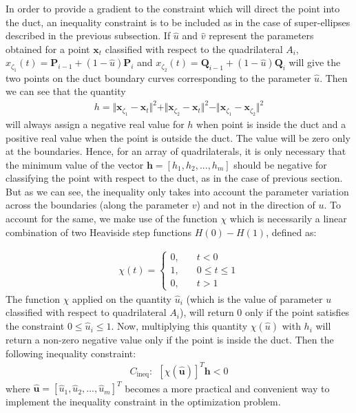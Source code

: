 \documentclass[12pt,a4]{article}
\begin{document}
In order to provide a gradient to the constraint which will direct the point into the duct, an inequality constraint is to be included as in the case of super-ellipses described in the previous subsection. If $\hat{u}$ and $\hat{v}$ represent the parameters obtained for a point $\mathbf{x}_t$ classified with respect to the quadrilateral $A_i$, $x_{\zeta_1}(t) = \mathbf{P}_{i-1}+\left(1-{\hat{u}} \right)\mathbf{P}_i$ and $x_{\zeta_2}(t) = \mathbf{Q}_{i-1}+\left(1-{\hat{u}} \right)\mathbf{Q}_i$ will give the two points on the duct boundary curves corresponding to the parameter $\hat{u}$. Then we can see that the quantity
\begin{align}
\label{eq:ductgradientinquad}
h = \Vert \mathbf{x}_{\zeta_1}-\mathbf{x}_t\Vert^2+\Vert \mathbf{x}_{\zeta_2}-\mathbf{x}_t\Vert^2-\Vert \mathbf{x}_{\zeta_1}- \mathbf{x}_{\zeta_2}\Vert^2
\end{align}
will always assign a negative real value for $h$ when point is inside the duct and a positive real value when the point is outside the duct. The value will be zero only at the boundaries. Hence, for an array of quadrilaterals, it is only necessary that the minimum value of the vector $\mathbf{h} = [{h}_1, {h}_2,...,{h}_m]$ should be negative for classifying the point with respect to the duct, as in the case of previous section. But as we can see, the inequality only takes into account the parameter variation across the boundaries (along the parameter $v$) and not in the direction of $u$. To account for the same, we make use of the function $\chi$ which is necessarily a linear combination of two Heaviside step functions $H(0)-H(1)$, defined as:

\begin{align}
\label{eq:chifunction}
\chi(t) = \left\lbrace \begin{matrix}
0,&\quad t<0 \\
1,&\quad 0\leq t \leq 1\\
0, &\quad t >1
\end{matrix}\right.
\end{align}
The function $\chi$ applied on the quantity $\hat{u}_i$ (which is the value of parameter ${u}$ classified with respect to quadrilateral $A_i$), will return 0 only if the point satisfies the constraint $0\leq \hat{u}_i\leq 1$. Now, multiplying this quantity $\chi(\hat{u})$ with $h_i$ will return a non-zero negative value only if the point is inside the duct. Then the following inequality constraint:
\begin{align}
\label{eq:quadrils}
C_{\text{ineq}}:~~\left[\chi\left(\hat{\mathbf{u}}\right)\right]^T\mathbf{h}<0
\end{align}
where $\hat{\mathbf{u}}=\left[\hat{u}_1,\hat{u}_2,...,\hat{u}_m\right]^T$ becomes a more practical and convenient way to implement the inequality constraint in the optimization problem.
\end{document}
